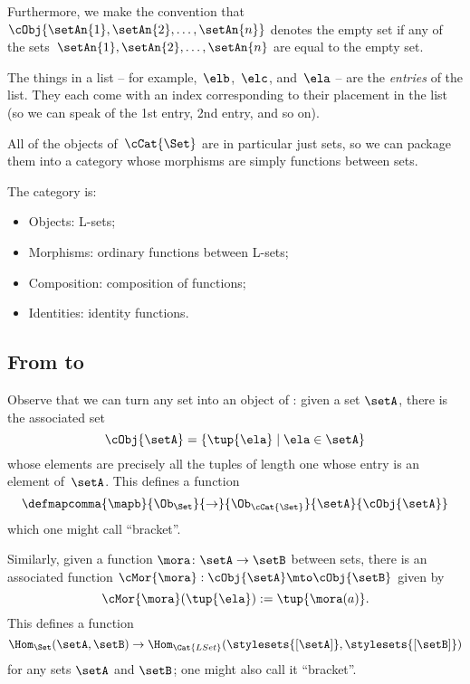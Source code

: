 Furthermore, we make the convention that~$\cObj{\setAn{1}, \setAn{2}, \dots, \setAn{n}}$ denotes the empty set if any of the sets~$\setAn{1}, \setAn{2}, \dots , \setAn{n}$ are equal to the empty set.

The things in a list -- for example,~$\elb$,~$\elc$, and~$\ela$ -- are the \emph{entries} of the list.
They each come with an index corresponding to their placement in the list (so we can speak of the 1st entry, 2nd entry, and so on).

All of the objects of~$\cCat{\Set}$ are in particular just sets, so we can package them into a category whose morphisms are simply functions between sets.

\begin{ctdefinition}[\cCat{\Set}]
    The category \cCat{\Set} is:

    \begin{itemize}
        \item Objects: L-sets;
        \item Morphisms: ordinary functions between L-sets;
        \item Composition: composition of functions;
        \item Identities: identity functions.
    \end{itemize}
\end{ctdefinition}

\subsection{From \Set to \cCat{\Set}}

Observe that we can turn any set into an object of \cCat{\Set}: given a set $\setA$, there is the associated set
\begin{equation*}
    \cObj{\setA} = \{ \tup{\ela} \mid \ela \in \setA \}
\end{equation*}
whose elements are precisely all the tuples of length one whose entry is an element of~$\setA$.
This defines a function
\begin{equation*}
    \defmapcomma{\mapb}{\Ob_{\Set}}
    {\to}
    {\Ob_{\cCat{\Set}}}
    {\setA }
    {\cObj{\setA}}
\end{equation*}
which one might call ``bracket''.

Similarly, given a function $\mora \colon \setA \to \setB$ between sets, there is an associated function $\cMor{ \mora }: \cObj{\setA} \mto \cObj{\setB}$ given by
\begin{equation}
    \cMor{ \mora } ( \tup{ \ela }) := \tup{\mora(a)}.
\end{equation}
This defines a function
\begin{equation}
    \Hom_{\Set}(\setA,\setB) \to \Hom_{\Cat{LSet}}(\stylesets{[\setA]},\stylesets{[\setB]})
\end{equation}
for any sets $\setA$ and $\setB$; one might also call it ``bracket''.


